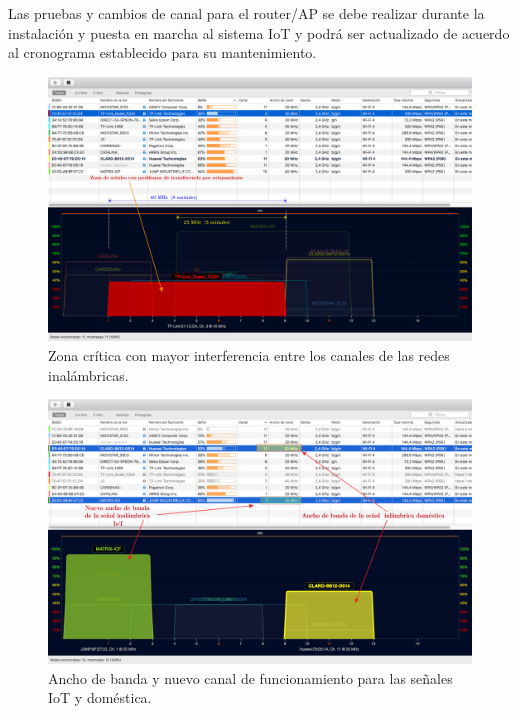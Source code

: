 Las pruebas y cambios de canal para el router/AP se debe realizar durante la instalación y puesta en marcha al sistema IoT y podrá ser actualizado de acuerdo al cronograma establecido para su mantenimiento. 



\begin{landscape} %
\begin{figure}[htpb]
\centering 
\includegraphics[width=1.5\textwidth]{./Figures/wifi/04.png}
\caption{Zona crítica con mayor interferencia entre los canales de las redes inalámbricas.}
\label{fig:test04}
\end{figure}
\end{landscape} %



\begin{landscape} %
\begin{figure}[htpb]
\centering 
\includegraphics[width=1.5\textwidth]{./Figures/wifi/05.png}
\caption{Ancho de banda y nuevo canal de funcionamiento para las señales IoT y doméstica.}
\label{fig:test05}
\end{figure}
\end{landscape} %


